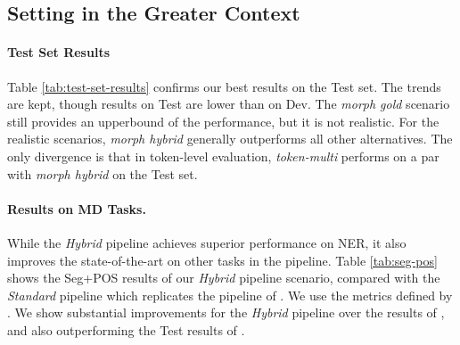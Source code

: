 \documentclass[11pt,a4paper]{article}
\newcommand{\MULMACRO}{{\em token-multi}\xspace}
\newcommand{\FLIPMACRO}{{\em Hybrid}\xspace}
\newcommand{\YAPMACRO}{{\em Standard}\xspace}
\begin{document}
\begin{table}[t]
\centering
{}
\caption{\label{tab:test-set-results} 
Test vs.\ Dev: Results with fastText for all Models. {\em morph-gold}  presents an ideal upper-bound. 
  }
  \vspace{-0.1in}
\end{table}


\subsection{Setting in the Greater Context}

\paragraph{Test Set Results}
Table \ref{tab:test-set-results}  confirms our best  results on the Test set. 
The  trends are kept,  though  results on Test are lower than on  Dev. The {\em morph gold} scenario still provides an upperbound of the performance, but it is not realistic. For the realistic scenarios, {\em morph hybrid} generally outperforms all other alternatives. The only divergence is that in token-level evaluation, \MULMACRO performs on a par with {\em morph hybrid} on the Test set. 


\paragraph{Results on MD Tasks.} 
While the \FLIPMACRO pipeline achieves superior performance on NER,
it also improves the state-of-the-art on other  tasks in the pipeline. Table \ref{tab:seg-pos} shows the   Seg+POS results  of our \FLIPMACRO pipeline scenario, compared with the \YAPMACRO pipeline which replicates the pipeline of \citet{more-etal-2019-joint}. We use the  metrics defined by \citet{more-etal-2019-joint}. 
We show substantial improvements for the \FLIPMACRO pipeline
over the results of \citet{more-etal-2019-joint}, and    also outperforming the Test results of \citet{seker-tsarfaty-2020-pointer}.
\end{document}
